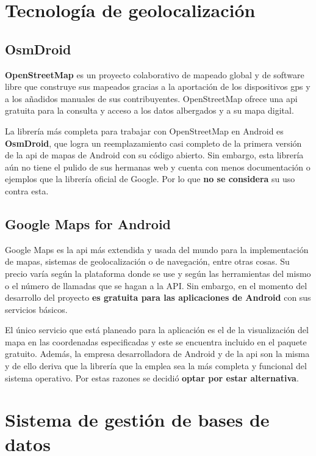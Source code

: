 \section{Tecnología de geolocalización}

\subsection{OsmDroid}

\textbf{OpenStreetMap} es un proyecto colaborativo de mapeado global y de software libre que construye sus mapeados gracias a la aportación de los dispositivos \acrshort{gps} y a los añadidos manuales de sus contribuyentes. OpenStreetMap ofrece una \acrshort{api} gratuita para la consulta y acceso a los datos albergados y a su mapa digital.

La librería más completa para trabajar con OpenStreetMap en Android es \textbf{OsmDroid}, que logra un reemplazamiento casi completo de la primera versión de la \acrshort{api} de mapas de Android con su código abierto. Sin embargo, esta librería aún no tiene el pulido de sus hermanas web y cuenta con menos documentación o ejemplos que la librería oficial de Google. Por lo que \textbf{no se considera} su uso contra esta. 

\subsection{Google Maps for Android}

Google Maps es la \acrshort{api} más extendida y usada del mundo para la implementación de mapas, sistemas de geolocalización o de navegación, entre otras cosas. Su precio varía según la plataforma donde se use y según las herramientas del mismo o el número de llamadas que se hagan a la API. Sin embargo, en el momento del desarrollo del proyecto \textbf{es gratuita para las aplicaciones de Android} con sus servicios básicos.

El único servicio que está planeado para la aplicación es el de la visualización del mapa en las coordenadas especificadas y este se encuentra incluido en el paquete gratuito. Además, la empresa desarrolladora de Android y de la \acrshort{api} son la misma y de ello deriva que la librería que la emplea sea la más completa y funcional del sistema operativo. Por estas razones se decidió \textbf{optar por estar alternativa}.

\section{Sistema de gestión de bases de datos}

